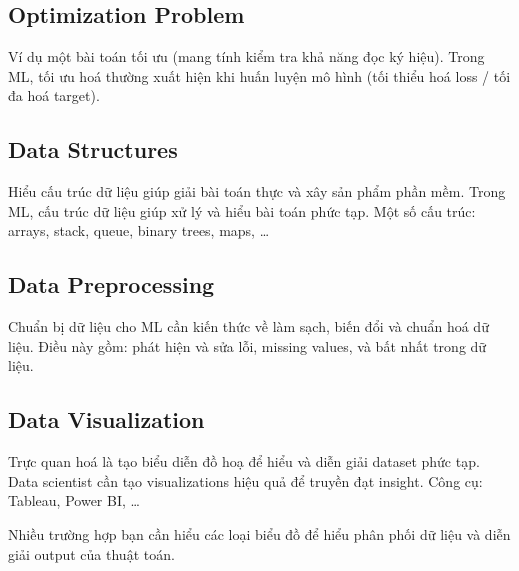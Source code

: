 \subsection{Optimization Problem}

\begin{ynghia}[title={Tối ưu hoá trong ML}]
Ví dụ một bài toán tối ưu (mang tính kiểm tra khả năng đọc ký hiệu).
Trong ML, tối ưu hoá thường xuất hiện khi huấn luyện mô hình (tối thiểu hoá loss / tối đa hoá target).
\end{ynghia}

\subsection{Data Structures}

\begin{ynghia}[title={Vì sao cần cấu trúc dữ liệu?}]
Hiểu cấu trúc dữ liệu giúp giải bài toán thực và xây sản phẩm phần mềm.
Trong ML, cấu trúc dữ liệu giúp xử lý và hiểu bài toán phức tạp.
Một số cấu trúc: arrays, stack, queue, binary trees, maps, \ldots
\end{ynghia}

\subsection{Data Preprocessing}

\begin{ynghia}[title={Tiền xử lý dữ liệu}]
Chuẩn bị dữ liệu cho ML cần kiến thức về làm sạch, biến đổi và chuẩn hoá dữ liệu.
Điều này gồm: phát hiện và sửa lỗi, missing values, và bất nhất trong dữ liệu.
\end{ynghia}

\subsection{Data Visualization}

\begin{ynghia}[title={Trực quan hoá dữ liệu}]
Trực quan hoá là tạo biểu diễn đồ hoạ để hiểu và diễn giải dataset phức tạp.
Data scientist cần tạo visualizations hiệu quả để truyền đạt insight.
Công cụ: Tableau, Power BI, \ldots
\end{ynghia}

\begin{luuy}[title={Hiểu các loại biểu đồ}]
Nhiều trường hợp bạn cần hiểu các loại biểu đồ để hiểu phân phối dữ liệu và diễn giải output của thuật toán.
\end{luuy}

